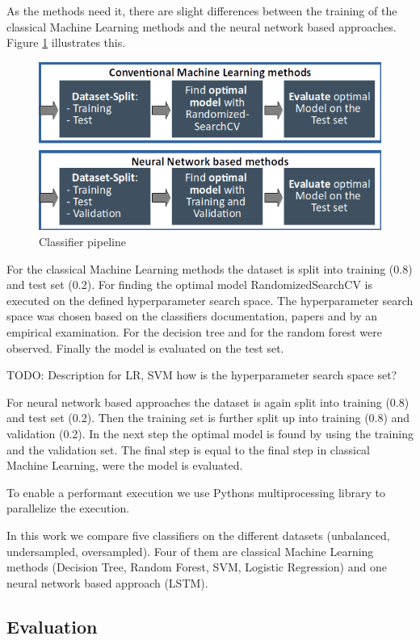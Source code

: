 As the methods need it, there are slight differences between the training of the classical Machine Learning methods and the neural network based approaches. Figure \ref{fig:classifier_pipeline} illustrates this.

\begin{figure}[ht]
	\centering
	\includegraphics[width=0.7\linewidth]{figures/classifier_pipeline.png}
	\caption{Classifier pipeline}
	\label{fig:classifier_pipeline}
\end{figure}

For the classical Machine Learning methods the dataset is split into training (0.8) and test set (0.2). For finding the optimal model Randomized\-SearchCV is executed on the defined hyperparameter search space. The hyperparameter search space was chosen based on the classifiers doc\-u\-men\-ta\-tion, papers and by an empirical examination. For the decision tree \cite{mantovani2019empirical} and for the random forest \cite{probstHyperparametersTuningStrategies2019} were observed. Finally the model is evaluated on the test set.

TODO: Description for LR, SVM how is the hyperparameter search space set?

For neural network based approaches the dataset is again split into training (0.8) and test set (0.2). Then the training set is further split up into training (0.8) and validation (0.2). In the next step the optimal model is found by using the training and the validation set. The final step is equal to the final step in classical Machine Learning, were the model is evaluated.

To enable a performant execution we use Pythons multiprocessing library to parallelize the execution.

In this work we compare five classifiers on the different datasets (unbalanced, undersampled, oversampled). Four of them are classical Machine Learning methods (Decision Tree, Random Forest, SVM, Logistic Regression) and one neural network based approach (LSTM).


\subsection{Evaluation}
\label{ch:approachF}

